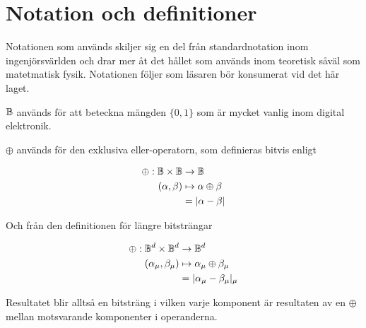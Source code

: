 \documentclass[a4paper, article, oneside, leqno]{memoir}
\begin{document}

\appendix

\chapter{Notation och definitioner} \label{sec:notation}
Notationen som används skiljer sig en del från standardnotation inom ingenjörsvärlden och drar mer åt det hållet som används inom teoretisk såväl som matetmatisk fysik. Notationen följer \cite{anders_mat_intro} som läsaren bör konsumerat vid det här laget.

$\mathbb{B}$ används för att beteckna mängden $\{0, 1\}$ som är mycket vanlig inom digital elektronik.

$\oplus$ används för den exklusiva eller-operatorn, som definieras bitvis enligt

\begin{align}\begin{split}
    \oplus : \mathbb{B} \times \mathbb{B} &\to \mathbb{B} \\
    (\alpha, \beta) &\mapsto \alpha \oplus \beta \\
    &= |\alpha - \beta|
\end{split}\end{align}

Och från den definitionen för längre bitsträngar

\begin{align}\begin{split}
    \oplus : \mathbb{B}^d \times \mathbb{B}^d &\to \mathbb{B}^d \\
    (\alpha_\mu, \beta_\mu) &\mapsto \alpha_\mu \oplus \beta_\mu \\
    &= |\alpha_\mu - \beta_\mu|_\mu
\end{split}\end{align}

Resultatet blir alltså en bitsträng i vilken varje komponent är resultaten av en $\oplus$ mellan motsvarande komponenter i operanderna.

%




\end{document}
